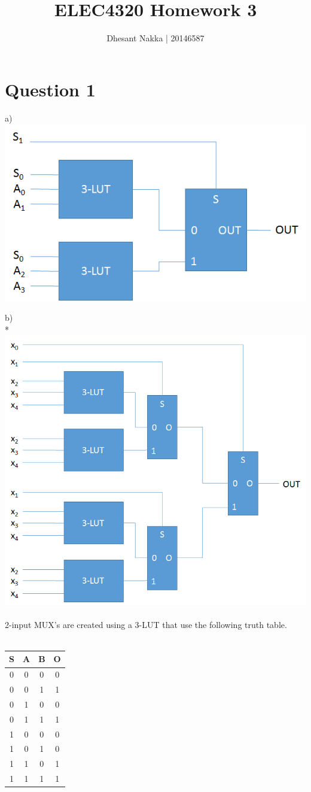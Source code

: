 \documentclass[11pt]{article}
\title{ELEC4320 Homework 3}
\author{Dhesant Nakka | 20146587}
\begin{document}
\maketitle

\section*{Question 1}
a)
  \includegraphics[width=\linewidth]{q1_mux.png}

b)\\*
  \includegraphics[width=\linewidth]{q1_lut.png}\\\\
  2-input MUX's are created using a 3-LUT that use the following truth table.\\\\
  \begin{tabular}{ | c c c | c | }
    \hline
    S & A & B & O \\
    \hline
    0 & 0 & 0 & 0 \\
    0 & 0 & 1 & 1 \\
    0 & 1 & 0 & 0 \\
    0 & 1 & 1 & 1 \\
    1 & 0 & 0 & 0 \\
    1 & 0 & 1 & 0 \\
    1 & 1 & 0 & 1 \\
    1 & 1 & 1 & 1 \\
    \hline
  \end{tabular}
\end{document}
